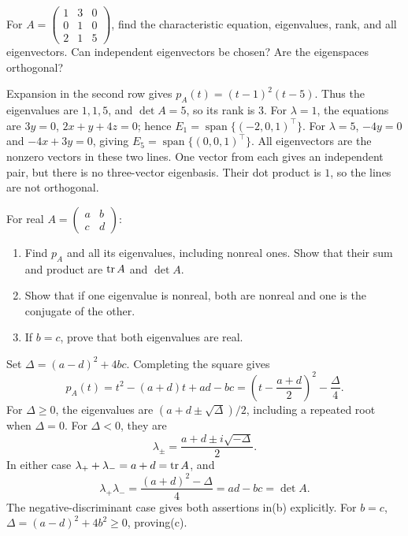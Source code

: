 \begin{problem}\label{ex:08:ma-three}
For \(A=\begin{pmatrix}1&3&0\\0&1&0\\2&1&5\end{pmatrix}\), find the
characteristic equation, eigenvalues, rank, and all eigenvectors.
Can independent eigenvectors be chosen? Are the eigenspaces orthogonal?
\end{problem}
\begin{solution}
Expansion in the second row gives \(p_A(t)=(t-1)^2(t-5)\).
Thus the eigenvalues are \(1,1,5\), and \(\det A=5\), so its rank is \(3\).
For \(\lambda=1\), the equations are \(3y=0\), \(2x+y+4z=0\);
hence \(E_1=\operatorname{span}\{(-2,0,1)^\top\}\).
For \(\lambda=5\), \(-4y=0\) and \(-4x+3y=0\), giving
\(E_5=\operatorname{span}\{(0,0,1)^\top\}\).
All eigenvectors are the nonzero vectors in these two lines.
One vector from each gives an independent pair, but there is no
three-vector eigenbasis. Their dot product is \(1\), so the lines
are not orthogonal.
\end{solution}

\begin{problem}\label{ex:08:quadratic}
For real \(A=\begin{pmatrix}a&b\\c&d\end{pmatrix}\):
\begin{enumerate}
\item Find \(p_A\) and all its eigenvalues, including nonreal ones.
Show that their sum and product are \(\operatorname{tr} A\) and \(\det A\).
\item Show that if one eigenvalue is nonreal, both are nonreal and
one is the conjugate of the other.
\item If \(b=c\), prove that both eigenvalues are real.
\end{enumerate}
\end{problem}
\begin{solution}
Set \(\Delta=(a-d)^2+4bc\). Completing the square gives
\[
 p_A(t)=t^2-(a+d)t+ad-bc
       =\left(t-\frac{a+d}{2}\right)^2-\frac{\Delta}{4}.
\]
For \(\Delta\geqslant0\), the eigenvalues are
\((a+d\pm\sqrt\Delta)/2\), including a repeated root when \(\Delta=0\).
For \(\Delta<0\), they are
\[
 \lambda_\pm=\frac{a+d\pm i\sqrt{-\Delta}}2.
\]
In either case \(\lambda_++\lambda_-=a+d=\operatorname{tr} A\), and
\[
 \lambda_+\lambda_-=\frac{(a+d)^2-\Delta}{4}=ad-bc=\det A.
\]
The negative-discriminant case gives both assertions in(b) explicitly.
For \(b=c\), \(\Delta=(a-d)^2+4b^2\geqslant0\), proving(c).
\end{solution}

